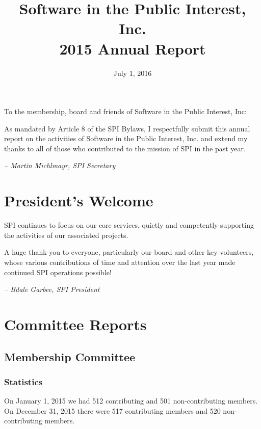\documentclass[letterpaper]{report}
\begin{document}
\title{Software in the Public Interest, Inc.\\
2015 Annual Report}
\date{July 1, 2016}

\maketitle

To the membership, board and friends of Software in the Public Interest, Inc:

As mandated by Article 8 of the SPI Bylaws, I respectfully submit this annual
report on the activities of Software in the Public Interest, Inc. and extend my
thanks to all of those who contributed to the mission of SPI in the past year.

  \emph{-- Martin Michlmayr, SPI Secretary}

\newpage

\tableofcontents

\newpage

\chapter{President's Welcome}
\label{sec:president}

SPI continues to focus on our core services, quietly and competently
supporting the activities of our associated projects.

A huge thank-you to everyone, particularly our board and other key
volunteers, whose various contributions of time and attention over the last
year made continued SPI operations possible!

  \emph{-- Bdale Garbee, SPI President}

\chapter{Committee Reports}
\section{Membership Committee}

\subsection{Statistics}

On January 1, 2015 we had 512 contributing and 501 non-contributing members.
On December 31, 2015 there were 517 contributing members and 520 non-contributing
members.
\end{document}

